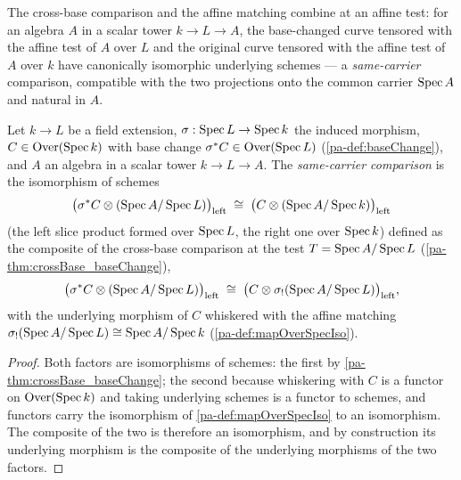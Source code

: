 The cross-base comparison and the affine matching combine at an affine test: for an
algebra \(A\) in a scalar tower \(k \to L \to A\), the base-changed curve tensored with
the affine test of \(A\) over \(L\) and the original curve tensored with the affine test
of \(A\) over \(k\) have canonically isomorphic underlying schemes --- a
\emph{same-carrier} comparison, compatible with the two projections onto the common
carrier \(\operatorname{Spec} A\) and natural in \(A\).

\begin{definition}
  \label{pa-def:crossBaseAffineIso}
  \leanok

  Let \(k \to L\) be a field extension, \(\sigma : \operatorname{Spec} L \to \operatorname{Spec} k\) the induced
  morphism, \(C \in \mathrm{Over}(\operatorname{Spec} k)\) with base change \(\sigma^{*}C \in \mathrm{Over}(\operatorname{Spec} L)\)
  (\ref{pa-def:baseChange}), and \(A\) an algebra in a scalar tower \(k \to L \to A\). The
  \emph{same-carrier comparison} is the isomorphism of schemes
  \[
    \bigl(\sigma^{*}C \otimes (\operatorname{Spec} A/\operatorname{Spec} L)\bigr)_{\mathrm{left}}
      \;\cong\; \bigl(C \otimes (\operatorname{Spec} A/\operatorname{Spec} k)\bigr)_{\mathrm{left}}
  \]
  (the left slice product formed over \(\operatorname{Spec} L\), the right one over \(\operatorname{Spec} k\))
  defined as the composite of the cross-base comparison at the test
  \(T = \operatorname{Spec} A/\operatorname{Spec} L\) (\ref{pa-thm:crossBase_baseChange}),
  \[
    \bigl(\sigma^{*}C \otimes (\operatorname{Spec} A/\operatorname{Spec} L)\bigr)_{\mathrm{left}} \;\cong\;
    \bigl(C \otimes \sigma_{!}(\operatorname{Spec} A/\operatorname{Spec} L)\bigr)_{\mathrm{left}},
  \]
  with the underlying morphism of \(C\) whiskered with the affine matching
  \(\sigma_{!}(\operatorname{Spec} A/\operatorname{Spec} L) \cong \operatorname{Spec} A/\operatorname{Spec} k\) (\ref{pa-def:mapOverSpecIso}).
\end{definition}
\begin{proof}
  \leanok
  Both factors are isomorphisms of schemes: the first by
  \ref{pa-thm:crossBase_baseChange}; the second because whiskering with \(C\) is a functor
  on \(\mathrm{Over}(\operatorname{Spec} k)\) and taking underlying schemes is a functor to schemes, and
  functors carry the isomorphism of \ref{pa-def:mapOverSpecIso} to an isomorphism. The
  composite of the two is therefore an isomorphism, and by construction its underlying
  morphism is the composite of the underlying morphisms of the two factors.
\end{proof}

